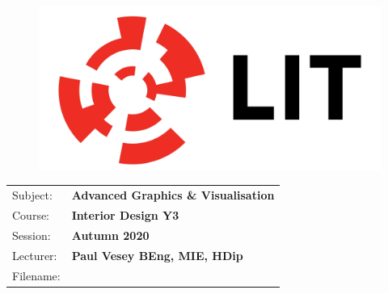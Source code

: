 \documentclass[a4paper, 10pt]{article}
\begin{document}
\lstset{language=HTML,
				basicstyle=\small,
				breaklines=true,
        numbers=left,
        numberstyle=\tiny,
        showstringspaces=false,
        aboveskip=-20pt,
        frame=leftline
        }
				
\begin{figure}
	\centering
	\includegraphics[width=0.5\linewidth]{./img/LITlogo}
\end{figure}


\begin{tabularx}{\textwidth}{ |l|X| }
	\hline

	Subject: & \textbf{Advanced Graphics \& Visualisation}\\
	Course: & \textbf{Interior Design Y3}\\
	Session: & \textbf{Autumn 2020}\\
	Lecturer: & \textbf{Paul Vesey \footnotesize{BEng, MIE, HDip}}\\
	Filename: & \currfilebase\\
	\hline
\end{tabularx}
\end{document}
